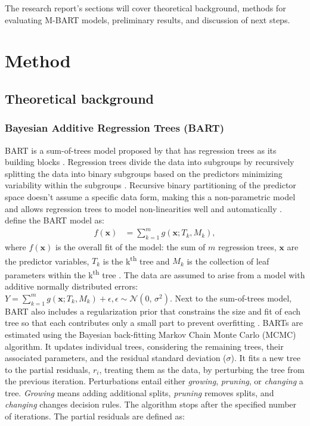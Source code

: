 \documentclass[10pt, a4paper, titlepage]{article}
\begin{document}
The research report's sections will cover theoretical background, methods for evaluating M-BART models, preliminary results, and discussion of next steps.

\section{Method}
\subsection{Theoretical background}
\subsubsection{Bayesian Additive Regression Trees (BART)}
BART is a sum-of-trees model proposed by \citet{chipman2010} that has regression trees as its building blocks \citep{chipman2010, hill2020, james2021}. Regression trees divide the data into subgroups by recursively splitting the data into binary subgroups based on the predictors minimizing variability within the subgroups \citep{hastie2017, james2021, salditt2023}. Recursive binary partitioning of the predictor space doesn't assume a specific data form, making this a non-parametric model \citep{hastie2017, james2021, salditt2023} and allows regression trees to model non-linearities well and automatically \citep{hill2020, burgette2010}. \citet{chipman2010} define the BART model as:
\begin{align}
\label{eq:BART}
f(\textbf{x}) &= \sum^{m}_{k=1}g(\textbf{x}; T_{k}, M_{k}),
\end{align} where $f(\mathbf{x})$ is the overall fit of the model: the sum of $m$ regression trees, $\textbf{x}$ are the predictor variables, $T_{k}$ is the k\textsuperscript{th} tree and $M_{k}$ is the collection of leaf parameters within the k\textsuperscript{th} tree \citep{chipman2010, hill2020, james2021}. The data are assumed to arise from a model with additive normally distributed errors: $Y = \sum^{m}_{k=1}g(\textbf{x}; T_{k}, M_{k}) + \epsilon, \epsilon \sim \mathcal{N}(0,\,\sigma^{2})$.
Next to the sum-of-trees model, BART also includes a regularization prior that constrains the size and fit of each tree so that each contributes only a small part to prevent overfitting \citep{chipman2010, hill2020, james2021}. BARTs are estimated using the Bayesian back-fitting Markov Chain Monte Carlo (MCMC) algorithm. It updates individual trees, considering the remaining trees, their associated parameters, and the residual standard deviation ($\sigma$). It fits a new tree to the partial residuals, $r_{i}$, treating them as the data, by perturbing the tree from the previous iteration. Perturbations entail either \textit{growing}, \textit{pruning}, or \textit{changing} a tree. \textit{Growing} means adding additional splits, \textit{pruning} removes splits, and \textit{changing} changes decision rules. The algorithm stops after the specified number of iterations. The partial residuals are defined as:
\end{document}
